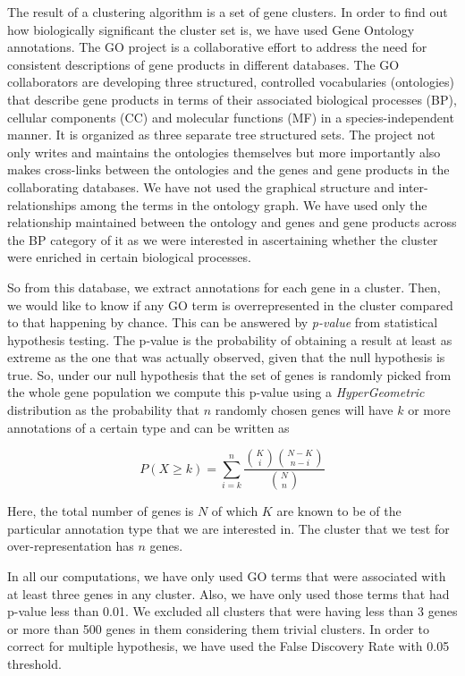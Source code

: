 The result of a clustering algorithm is a set of gene clusters. In order to find out how biologically significant the cluster set is, we have used 
Gene Ontology \citep{GO} annotations. The GO  project is a collaborative effort to address the need for consistent descriptions of gene products in different databases. 
The GO collaborators are developing three structured, controlled vocabularies (ontologies) that describe gene products in terms of their associated biological processes (BP), 
cellular components (CC) and molecular functions (MF) in a species-independent manner. It is organized as three separate tree structured sets. The project not only writes 
and maintains the ontologies themselves but more importantly also makes cross-links between the ontologies and the genes and gene products in the collaborating databases. 
We have not used the graphical structure and inter-relationships among the terms in the ontology graph. We have used only the relationship maintained between the 
ontology and genes and gene products across the BP category of it as we were interested in ascertaining whether the cluster were enriched in certain biological processes.

So from this database, we extract annotations for each gene in a cluster. Then, we would like to know if any GO term is  overrepresented in the cluster 
compared to that happening by chance. This can be answered by \textit{p-value} from statistical hypothesis testing. 
The p-value is the probability of obtaining a result at least as extreme as the one that was actually observed, given that the null hypothesis is true. 
So, under our null hypothesis that the set of genes is randomly picked from the whole gene population we compute this p-value using a \textit{HyperGeometric} distribution 
as the probability that $n$ randomly chosen genes will have $k$ or more annotations of a certain type and can be written as

\[
P(X \geq k) = \sum_{i=k}^{n} \frac{\binom{K}{i} \binom{N-K}{n-i}}{\binom {N}{n}}
\]
 
Here, the total number of genes is $N$ of which $K$ are known to be of the particular annotation type that we are interested in. The cluster that we test for over-representation has $n$ genes.

In all our computations, we have only used GO terms that were associated with at least three genes in any cluster. Also, we have only used those terms that had p-value less than 0.01. 
We excluded all clusters that were having less than 3 genes or more than 500 genes in them considering them trivial clusters. In order to correct for multiple hypothesis, we have used the False Discovery Rate with 0.05 threshold.  

